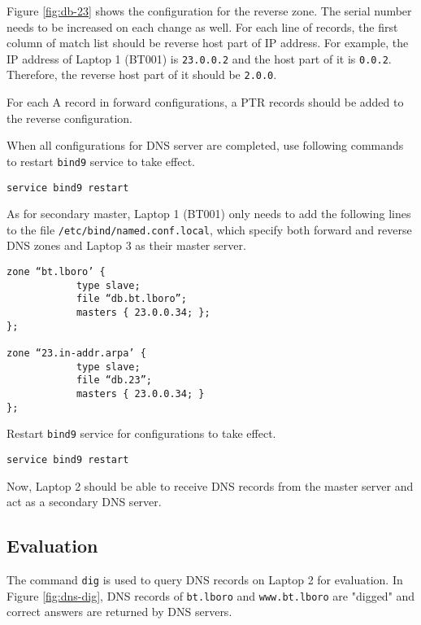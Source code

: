 Figure \ref{fig:db-23} shows the configuration for the reverse zone. 
The serial number needs to be increased on each change as well. 
For each line of records, the first column of match list should be reverse host part of IP address. 
For example, the IP address of Laptop 1 (BT001) is \texttt{23.0.0.2} and the host part of it is \texttt{0.0.2}. Therefore, the reverse host part of it should be \texttt{2.0.0}. 

For each A record in forward configurations, a PTR records should be added to the reverse configuration.

When all configurations for DNS server are completed, use following commands to restart \texttt{bind9} service to take effect.

\begin{lstlisting}
service bind9 restart
\end{lstlisting}

As for secondary master, Laptop 1 (BT001) only needs to add the following lines to the file \texttt{/etc/bind/named.conf.local}, which specify both forward and reverse DNS zones and Laptop 3 as their master server.

\begin{lstlisting}
zone “bt.lboro’ {
			type slave;
			file “db.bt.lboro”;
			masters { 23.0.0.34; };
};

zone “23.in-addr.arpa’ {
			type slave;
			file “db.23”;
			masters { 23.0.0.34; }
};
\end{lstlisting}

Restart \texttt{bind9} service for configurations to take effect.

\begin{lstlisting}
service bind9 restart
\end{lstlisting}

Now, Laptop 2 should be able to receive DNS records from the master server and act as a secondary DNS server.




\subsection{Evaluation}

The command \texttt{dig} is used to query DNS records on Laptop 2 for evaluation. In Figure \ref{fig:dns-dig}, DNS records of \texttt{bt.lboro} and \texttt{www.bt.lboro} are "digged" and correct answers are returned by DNS servers.

